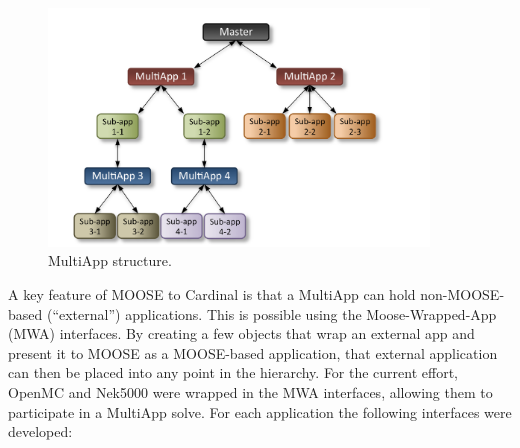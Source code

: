 \begin{figure}[!h]
\centering
\includegraphics[clip=true,width=0.9\textwidth]{Figures/moose1}
\caption{MultiApp structure.}
\label{f:moose1}
\end{figure}


A key feature of MOOSE to Cardinal is that a MultiApp can hold non-MOOSE-based (``external'')
applications. This is possible using the Moose-Wrapped-App (MWA) interfaces. By
creating a few objects that wrap an external app and present it to MOOSE as a
MOOSE-based application, that external application can then be placed into any
point in the hierarchy. For the current effort, OpenMC and Nek5000 were wrapped
in the MWA interfaces, allowing them to participate in a MultiApp solve. For
each application the following interfaces were developed:

